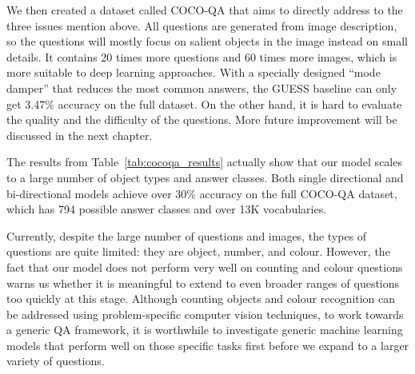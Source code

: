We then created a dataset called COCO-QA that aims to directly address to the three issues mention above. All questions are generated from image description, so the questions will mostly focus on salient objects in the image instead on small details. It contains 20 times more questions and 60 times more images, which is more suitable to deep learning approaches. With a specially designed ``mode damper'' that reduces the most common answers, the GUESS baseline can only get 3.47\% accuracy on the full dataset. On the other hand, it is hard to evaluate the quality and the difficulty of the questions. More future improvement will be discussed in the next chapter.

The results from Table~\ref{tab:cocoqa_results} actually show that our model scales to a large number of object types and answer classes. Both single directional and bi-directional models achieve over 30\% accuracy on the full COCO-QA dataset, which has 794 possible answer classes and over 13K vocabularies. 

Currently, despite the large number of questions and images, the types of questions are quite limited: they are object, number, and colour. However, the fact that our model does not perform very well on counting and colour questions warns us whether it is meaningful to extend to even broader ranges of questions too quickly at this stage. Although counting objects and colour recognition can be addressed using problem-specific computer vision techniques, to work towards a generic QA framework, it is worthwhile to investigate generic machine learning models that perform well on those specific tasks first before we expand to a larger variety of questions.

